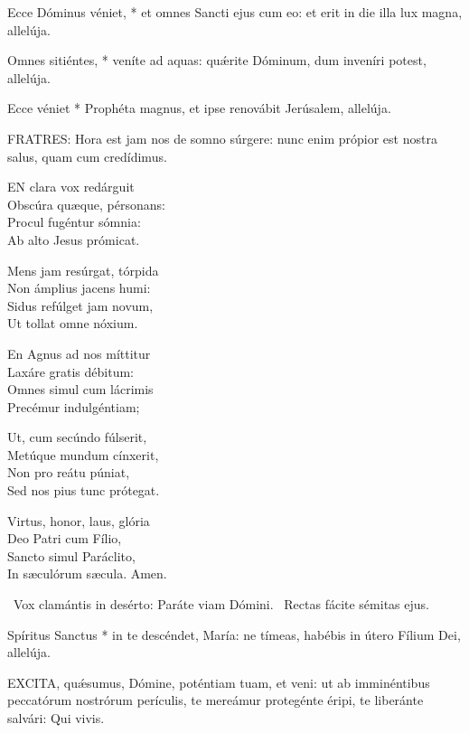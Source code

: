  Ecce Dóminus véniet, * et omnes Sancti ejus cum eo: et erit in die illa lux magna, allelúja.

 Omnes sitiéntes, * veníte ad aquas: quǽrite Dóminum, dum inveníri potest, allelúja.

 Ecce véniet * Prophéta magnus, et ipse renovábit Jerúsalem, allelúja.


\lettrine[lines=2]{F}{RATRES}: Hora est jam nos de somno súrgere: nunc enim própior est nostra salus, quam cum credídimus.


\lettrine[lines=2]{E}{N} clara vox redárguit\\
Obscúra quæque, pérsonans:\\
Procul fugéntur sómnia:\\
Ab alto Jesus prómicat.

Mens jam resúrgat, tórpida\\
Non ámplius jacens humi:\\
Sidus refúlget jam novum,\\
Ut tollat omne nóxium.

En Agnus ad nos míttitur\\
Laxáre gratis débitum:\\
Omnes simul cum lácrimis\\
Precémur indulgéntiam;

Ut, cum secúndo fúlserit,\\
Metúque mundum cínxerit,\\
Non pro reátu púniat,\\
Sed nos pius tunc prótegat.

Virtus, honor, laus, glória\\
Deo Patri cum Fílio,\\
Sancto simul Paráclito,\\
In sæculórum sæcula. Amen.

\V\ Vox clamántis in desérto: Paráte viam Dómini. \R\ Rectas fácite sémitas ejus.

 Spíritus Sanctus * in te descéndet, María: ne tímeas, habébis in útero Fílium Dei, allelúja.


\lettrine[lines=2]{E}{XCITA}, quǽsumus, Dómine, poténtiam tuam, et veni: ut ab imminéntibus peccatórum nostrórum perículis, te mereámur protegénte éripi, te liberánte salvári: Qui vivis.


